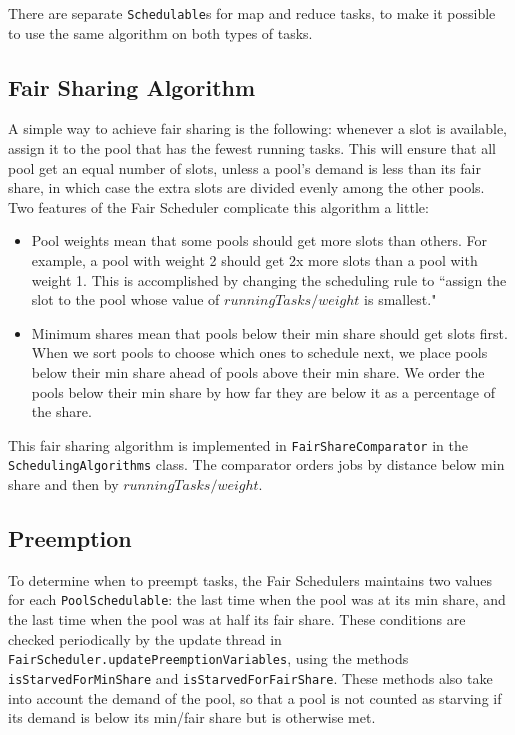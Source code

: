 \documentclass[11pt]{article}
\begin{document}
There are separate {\tt Schedulable}s for map and reduce tasks, to make it possible to use the same algorithm on both types of tasks.

\subsection{Fair Sharing Algorithm}
\label{sec:fair-sharing-alg}

A simple way to achieve fair sharing is the following: whenever a slot is available, assign it to the pool that has the fewest running tasks. This will ensure that all pool get an equal number of slots, unless a pool's demand is less than its fair share, in which case the extra slots are divided evenly among the other pools. Two features of the Fair Scheduler complicate this algorithm a little:
\begin{itemize}
  \item Pool weights mean that some pools should get more slots than others. For example, a pool with weight 2 should get 2x more slots than a pool with weight 1. This is accomplished by changing the scheduling rule to ``assign the slot to the pool whose value of $runningTasks/weight$ is smallest."
  \item Minimum shares mean that pools below their min share should get slots first. When we sort pools to choose which ones to schedule next, we place pools below their min share ahead of pools above their min share. We order the pools below their min share by how far they are below it as a percentage of the share.
\end{itemize}

This fair sharing algorithm is implemented in {\tt FairShareComparator} in the {\tt SchedulingAlgorithms} class. The comparator orders jobs by distance below min share and then by $runningTasks/weight$.

\subsection{Preemption}
\label{sec:preemption}

To determine when to preempt tasks, the Fair Schedulers maintains two values for each {\tt PoolSchedulable}: the last time when the pool was at its min share, and the last time when the pool was at half its fair share. These conditions are checked periodically by the update thread in {\tt FairScheduler.updatePreemptionVariables}, using the methods {\tt isStarvedForMinShare} and {\tt isStarvedForFairShare}. These methods also take into account the demand of the pool, so that a pool is not counted as starving if its demand is below its min/fair share but is otherwise met.
\end{document}
